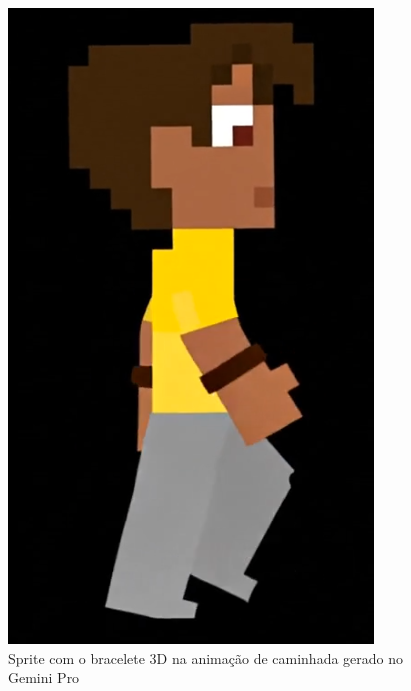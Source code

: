 \begin{figure}[htbp]
    \centering
    \begin{minipage}{0.45\textwidth}
        \centering
        \caption{\small Sprite com o bracelete 3D na animação de caminhada gerado no Gemini Pro}
        \label{fig:GeminiProAndarBracelete3D}
        \includegraphics[width=1\linewidth]{figs/geminiPro/chat7/bracelete3D.PNG}
    \end{minipage}\hfill

\end{figure}
